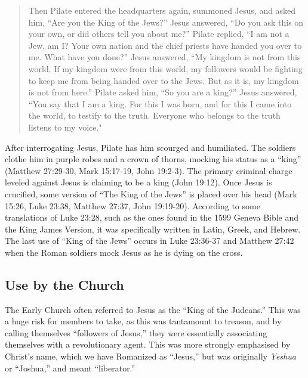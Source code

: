 \documentclass[letterpaper,11pt]{article}
\begin{document}
	\begin{quote}
		Then Pilate entered the headquarters again, summoned Jesus, and asked him, ``Are you the King of the Jews?'' Jesus answered, ``Do you ask this on your own, or did others tell you about me?'' Pilate replied, ``I am not a Jew, am I? Your own nation and the chief priests have handed you over to me. What have you done?'' Jesus answered, ``My kingdom is not from this world. If my kingdom were from this world, my followers would be fighting to keep me from being handed over to the Jews. But as it is, my kingdom is not from here.'' Pilate asked him, ``So you are a king?'' Jesus answered, ``You say that I am a king. For this I was born, and for this I came into the world, to testify to the truth. Everyone who belongs to the truth listens to my voice."
	\end{quote}
	
	After interrogating Jesus, Pilate has him scourged and humiliated. The soldiers clothe him in purple robes and a crown of thorns, mocking his status as a ``king'' (Matthew 27:29-30, Mark 15:17-19, John 19:2-3). The primary criminal charge leveled against Jesus is claiming to be a king (John 19:12). Once Jesus is crucified, some version of ``The King of the Jews'' is placed over his head (Mark 15:26, Luke 23:38, Matthew 27:37, John 19:19-20). According to some translations of Luke 23:28, such as the ones found in the 1599 Geneva Bible and the King James Version, it was specifically written in Latin, Greek, and Hebrew. The last use of ``King of the Jews'' occurs in Luke 23:36-37 and Matthew 27:42 when the Roman soldiers mock Jesus as he is dying on the cross.
		
	\subsection*{Use by the Church}
		
	The Early Church often referred to Jesus as the ``King of the Judeans.'' This was a huge risk for members to take, as this was tantamount to treason, and by calling themselves ``followers of Jesus,'' they were essentially associating themselves with a revolutionary agent. This was more strongly emphasised by Christ’s name, which we have Romanized as ``Jesus,'' but was originally \emph{Yeshua} or ``Joshua,'' and meant ``liberator.'' \cite{wren}
	
\end{document}
